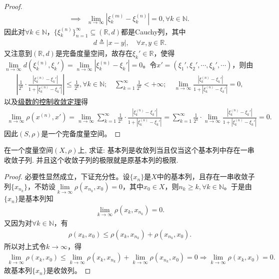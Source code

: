 \documentclass[../../main.tex]{subfiles}%
\begin{document}
\begin{proof}
\begin{align*}
\implies&\lim\limits_{n\rightarrow\infty}|\xi_k^{(m)}-\xi_k^{(n)}|=0,\forall k\in\mathbb{N}.
\end{align*}
因此对$\forall k\in\mathbb{N}$，$\{\xi_k^{(n)}\}_{n=1}^{\infty}\subseteq(\mathbb{R},d)$都是Cauchy列，其中
\begin{align*}
d\triangleq|x-y|,\quad\forall x,y\in\mathbb{R}.
\end{align*}
又注意到$(\mathbb{R},d)$是完备度量空间，故存在$\xi_k'\in\mathbb{R}$，使得$\lim\limits_{n\rightarrow\infty}d(\xi_k^{(n)},\xi_k')=\lim\limits_{n\rightarrow\infty}|\xi_k^{(n)}-\xi_k'|=0$。令$x'=(\xi_1',\xi_2',\cdots,\xi_k',\cdots)$，则由
\begin{align*}
\left|\frac{1}{2^k}\cdot\frac{|\xi_k^{(n)}-\xi_k'|}{1+|\xi_k^{(n)}-\xi_k'|}\right|\leqslant\frac{1}{2^k},\forall k\in\mathbb{N};\quad\sum\limits_{k=1}^{\infty}\frac{1}{2^k}<+\infty;\quad\lim\limits_{n\rightarrow\infty}\frac{|\xi_k^{(n)}-\xi_k'|}{1+|\xi_k^{(n)}-\xi_k'|}=0,
\end{align*}
以及\hyperref[Basis-of-Analytics-theorem:级数的控制收敛定理]{级数的控制收敛定理}得
\begin{align*}
\lim\limits_{n\rightarrow\infty}\rho(x^{(n)},x')=\lim\limits_{n\rightarrow\infty}\sum\limits_{k=1}^{\infty}\frac{1}{2^k}\cdot\frac{|\xi_k^{(n)}-\xi_k'|}{1+|\xi_k^{(n)}-\xi_k'|}=\sum\limits_{k=1}^{\infty}\frac{1}{2^k}\cdot\lim\limits_{n\rightarrow\infty}\frac{|\xi_k^{(n)}-\xi_k'|}{1+|\xi_k^{(n)}-\xi_k'|}=0.
\end{align*}
因此$(S,\rho)$是一个完备度量空间。

\end{proof}

\begin{proposition}\label{proposition:度量空间中基本列收敛当且仅当其子列收敛}
在一个度量空间$(X,\rho)$上, 求证: 基本列是收敛列当且仅当这个基本列中存在一串收敛子列.
并且这个收敛子列的极限就是原基本列的极限.
\end{proposition}
\begin{proof}

必要性显然成立，下证充分性。设$\{x_n\}$是$X$中的基本列，且存在一串收敛子列$\{x_{n_k}\}$，不妨设$\lim\limits_{k\rightarrow \infty}\rho(x_{n_k},x_0)=0$，其中$x_0\in X$，则$n_k\geqslant k,\forall k\in\mathbb{N}$。于是由$\{x_n\}$是基本列知
\begin{align*}
\lim\limits_{k\rightarrow \infty}\rho(x_k,x_{n_k})=0.
\end{align*}
又因为对$\forall k\in\mathbb{N}$，有
\begin{align*}
\rho(x_k,x_0)\leqslant \rho(x_k,x_{n_k})+\rho(x_{n_k},x_0).
\end{align*}
所以对上式令$k\rightarrow \infty$，得
\begin{align*}
\lim\limits_{k\rightarrow \infty}\rho(x_k,x_0)\leqslant \lim\limits_{k\rightarrow \infty}\rho(x_k,x_{n_k})+\lim\limits_{k\rightarrow \infty}\rho(x_{n_k},x_0)=0\Longrightarrow \lim\limits_{k\rightarrow \infty}\rho(x_k,x_0)=0.
\end{align*}
故基本列$\{x_n\}$是收敛列。

\end{proof}
\end{document}
